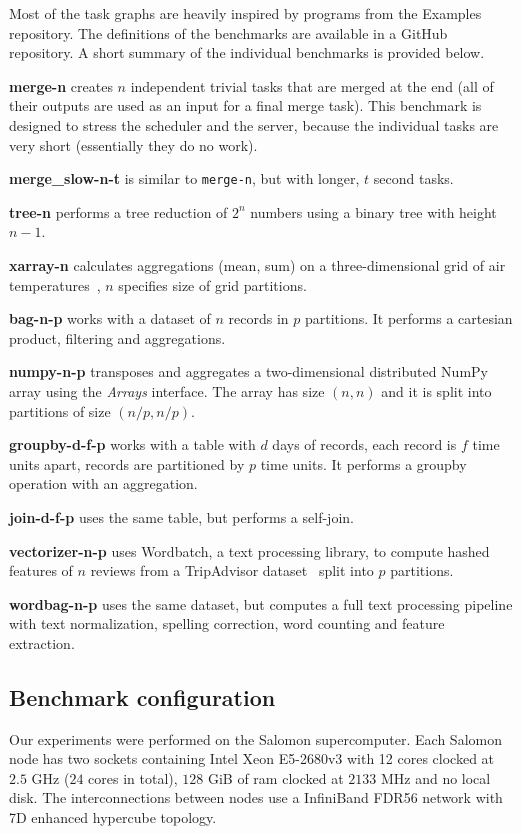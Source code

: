 Most of the task graphs are heavily inspired by programs from the \dask{}
Examples repository. The definitions of the benchmarks are available in
a GitHub repository. A short summary of the individual benchmarks is
provided below.

\noindent\textbf{merge-n} creates $n$ independent trivial tasks
that are merged at the end (all of their outputs are used as an input for a final merge task). This
benchmark is designed to stress the scheduler and the server, because the individual tasks are very
short (essentially they do no work).

\noindent\textbf{merge\_slow-n-t} is similar to \texttt{merge-n}, but with longer,
$t$ second tasks.

\noindent\textbf{tree-n} performs a tree reduction of $2^n$
numbers using a binary tree with height $n-1$.

\noindent\textbf{xarray-n} calculates aggregations (mean, sum) on a
three-dimensional grid of air temperatures~\cite{airdataset}, $n$
specifies size of grid partitions.

\noindent\textbf{bag-n-p} works with a dataset of $n$ records in
$p$ partitions. It performs a cartesian product, filtering and aggregations.

\noindent\textbf{numpy-n-p} transposes and aggregates a two-dimensional
distributed NumPy array using the \emph{Arrays} interface. The array has size
$(n,n)$ and it is split into partitions of size $(n/p,n/p)$.

\noindent\textbf{groupby-d-f-p} works with a table with $d$ days of
records, each record is $f$ time units apart, records are partitioned by
$p$ time units. It performs a groupby operation with an aggregation.

\noindent\textbf{join-d-f-p} uses the same table, but performs a self-join.

\noindent\textbf{vectorizer-n-p} uses
Wordbatch, a text processing library, to compute hashed features of
$n$ reviews from a TripAdvisor dataset~\cite{wordbatcharticle} split
into $p$ partitions.

\noindent\textbf{wordbag-n-p} uses the same dataset, but computes a full text processing
pipeline with text normalization, spelling correction, word counting and feature extraction.

\subsection*{Benchmark configuration}
Our experiments were performed on the Salomon supercomputer. Each
Salomon node has two sockets containing Intel Xeon E5-2680v3 with 12 cores clocked at
$2.5$ GHz ($24$ cores in total),
$128$ GiB of \gls{ram} clocked at $2133$
MHz and no local disk. The interconnections between nodes use a InfiniBand FDR56 network with 7D
enhanced hypercube topology.

